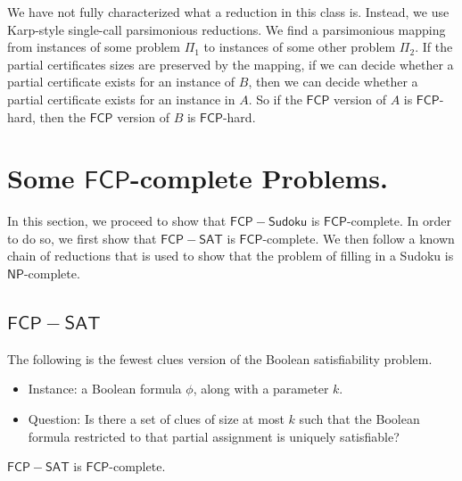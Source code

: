 \documentclass[runningheads,a4paper]{llncs}
\begin{document}
We have not fully characterized what a reduction in this class is. Instead, we use Karp-style single-call parsimonious reductions. We find a parsimonious mapping from instances of some problem $\Pi_1$ to instances of some other problem $\Pi_2$. If the partial certificates sizes are preserved by the mapping, if we can decide whether a partial certificate exists for an instance of $B$, then we can decide whether a partial certificate exists for an instance in $A$. So if the $\mathsf{FCP}$ version of $A$ is $\mathsf{FCP}$-hard, then the $\mathsf{FCP}$ version of $B$ is $\mathsf{FCP}$-hard. 

\section{Some $\mathsf{FCP}$-complete Problems.}
\label{sec:The Problems}

In this section, we proceed to show that $\mathsf{FCP-Sudoku}$ is $\mathsf{FCP}$-complete. In order to do so, we first show that $\mathsf{FCP-SAT}$ is $\mathsf{FCP}$-complete. We then follow a known chain of reductions that is used to show that the problem of filling in a Sudoku is $\mathsf{NP}$-complete. 

\subsection{$\mathsf{FCP-SAT}$}
The following is the fewest clues version of the Boolean satisfiability problem.

\begin{itemize}
\item Instance: a Boolean formula $\phi$, along with a parameter $k$.
\item Question: Is there a set of clues of size at most $k$ such that the Boolean formula restricted to that partial assignment is uniquely satisfiable?
\end{itemize}

\begin{theorem}
$\mathsf{FCP-SAT}$ is $\mathsf{FCP}$-complete.
\end{theorem}
\end{document}
